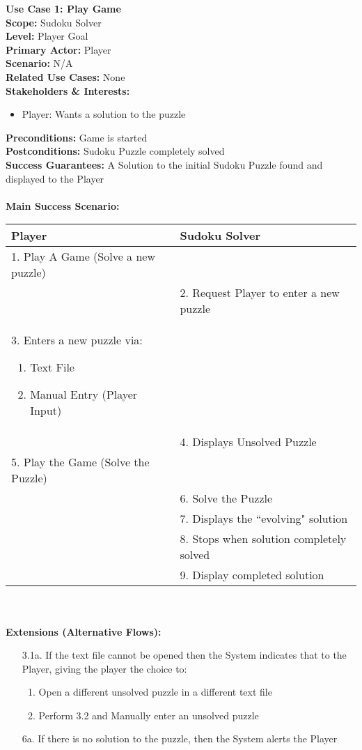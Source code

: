 \documentclass[letterpaper]{article}
\begin{document}
\noindent
\textbf{Use Case 1:  Play Game}\\
\textbf{Scope:  }Sudoku Solver\\
\textbf{Level:  }Player Goal\\
\textbf{Primary Actor:  }Player\\
\textbf{Scenario:  }N/A\\
\textbf{Related Use Cases:  }None\\
\textbf{Stakeholders \& Interests:}
\begin{itemize}
\item  Player:  Wants a solution to the puzzle
\end{itemize}
\textbf{Preconditions:  }Game is started\\
\textbf{Postconditions:  }Sudoku Puzzle completely solved\\
\textbf{Success Guarantees:  }A Solution to the initial Sudoku Puzzle
found and displayed to the Player\\\\
\textbf{Main Success Scenario:  }\\
\begin{tabular}{|p{5.75cm}|p{5.75cm}|}\hline
\textbf{Player} & \textbf{Sudoku Solver}\\\hline
1.  Play A Game (Solve a new puzzle) & \\\hline
& 2.  Request Player to enter a new puzzle\\\hline
3.  Enters a new puzzle via:
\begin{enumerate}
\item Text File
\item Manual Entry (Player Input)
\end{enumerate} & \\\hline
& 4.  Displays Unsolved Puzzle\\\hline
5.  Play the Game (Solve the Puzzle) &\\\hline
& 6. Solve the Puzzle\\\hline
& 7. Displays the ``evolving" solution\\\hline
& 8. Stops when solution completely solved\\\hline
& 9. Display completed solution\\\hline
\end{tabular}\\\\
\textbf{Extensions (Alternative Flows):}
\begin{itemize}
\item[3.1a.]If the text file cannot be opened then the System
indicates that to the Player, giving the player the choice to:
\begin{enumerate}
\item Open a different unsolved puzzle in a different text file
\item Perform 3.2 and Manually enter an unsolved puzzle
\end{enumerate}
\item[6a.]If there is no solution to the puzzle, then the System
alerts the Player
\end{itemize}
\end{document}
